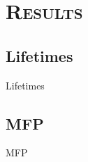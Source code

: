 \documentclass{beamer}
\begin{document}
\section{\scshape Results}
\subsection{Lifetimes}
\begin{frame}{Lifetimes}
\begin{figure}[!h]
\begin{center}
\renewcommand{\figure}{Fig.}
\label{fig:lifetimes}
\end{center}
\end{figure}
\end{frame}

\subsection{MFP}
\begin{frame}{MFP}
\begin{figure}[t]
\begin{center}
\vspace*{-0.8cm}
\renewcommand{\figure}{Fig.}
\label{fig:sed}
\end{center}
\end{figure}
\end{frame}


\end{document}
